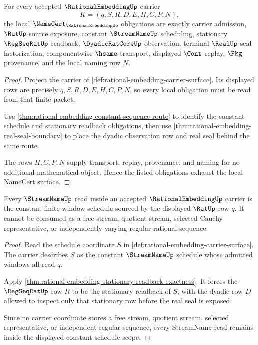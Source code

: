 \begin{theorem}
\label{thm:rational-embedding-namecert-obligations}
For every accepted $\RationalEmbeddingUp$ carrier
$$
K=(q,S,R,D,E,H,C,P,N),
$$
the local $\NameCert_{\RationalEmbeddingUp}$ obligations are exactly carrier admission, $\RatUp$ source exposure, constant $\StreamNameUp$ scheduling, stationary $\RegSeqRatUp$ readback, $\DyadicRatCoreUp$ observation, terminal $\RealUp$ seal factorization, componentwise $\hsame$ transport, displayed $\Cont$ replay, $\Pkg$ provenance, and the local naming row $N$.
\end{theorem}
\begin{proof}
Project the carrier of \autoref{def:rational-embedding-carrier-surface}. Its displayed rows are precisely $q,S,R,D,E,H,C,P,N$, so every local obligation must be read from that finite packet.

Use \autoref{thm:rational-embedding-constant-sequence-route} to identify the constant schedule and stationary readback obligations, then use \autoref{thm:rational-embedding-real-seal-boundary} to place the dyadic observation row and real seal behind the same route.

The rows $H,C,P,N$ supply transport, replay, provenance, and naming for no additional mathematical object. Hence the listed obligations exhaust the local NameCert surface.
\end{proof}

\begin{theorem}
\label{thm:rational-embedding-streamname-scope}
Every $\StreamNameUp$ read inside an accepted $\RationalEmbeddingUp$ carrier is the constant finite-window schedule sourced by the displayed $\RatUp$ row $q$. It cannot be consumed as a free stream, quotient stream, selected Cauchy representative, or independently varying regular-rational sequence.
\end{theorem}
\begin{proof}
Read the schedule coordinate $S$ in \autoref{def:rational-embedding-carrier-surface}. The carrier describes $S$ as the constant $\StreamNameUp$ schedule whose admitted windows all read $q$.

Apply \autoref{thm:rational-embedding-stationary-readback-exactness}. It forces the $\RegSeqRatUp$ row $R$ to be the stationary readback of $S$, with the dyadic row $D$ allowed to inspect only that stationary row before the real seal is exposed.

Since no carrier coordinate stores a free stream, quotient stream, selected representative, or independent regular sequence, every StreamName read remains inside the displayed constant schedule scope.
\end{proof}

